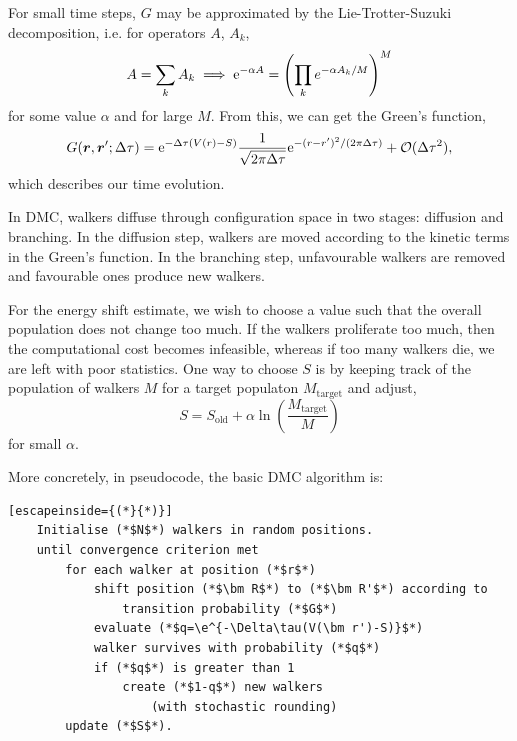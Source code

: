 For small time steps, $G$ may be approximated by the Lie-Trotter-Suzuki decomposition, i.e. for operators $A$, $A_k$,
\begin{equation}
    A = \sum_kA_k \implies \mathrm{e}^{-\alpha A} = \left( \prod_k e^{-\alpha A_k/M} \right)^M
\end{equation}
for some value $\alpha$ and for large $M$. From this, we can get the Green's function,
\begin{equation}
    G(\bm r, \bm r'; \Delta\tau) = \mathrm{e}^{-\Delta\tau(V(r)-S)}\frac{1}{\sqrt{2\pi\Delta\tau}}\mathrm{e}^{-(r - r')^2/(2\pi\Delta\tau)}+\mathcal{O}(\Delta\tau^2),
\end{equation}
which describes our time evolution.

In \gls{DMC}, walkers diffuse through configuration space in two stages: diffusion and branching. In the diffusion step, walkers are moved according to the kinetic terms in the Green's function. In the branching step, unfavourable walkers are removed and favourable ones produce new walkers.

For the energy shift estimate, we wish to choose a value such that the overall population does not change too much. If the walkers proliferate too much, then the computational cost becomes infeasible, whereas if too many walkers die, we are left with poor statistics. One way to choose $S$ is by keeping track of the population of walkers $M$ for a target populaton $M_\mathrm{target}$ and adjust,
\begin{equation}
    S = S_\mathrm{old} + \alpha\ln\left(\frac{M_\mathrm{target}}{M}\right)
\end{equation}
for small $\alpha$.

More concretely, in pseudocode, the basic \gls{DMC} algorithm is:

\begin{minipage}{\textwidth}
\begin{lstlisting}[escapeinside={(*}{*)}]
    Initialise (*$N$*) walkers in random positions.
    until convergence criterion met
        for each walker at position (*$r$*)
            shift position (*$\bm R$*) to (*$\bm R'$*) according to
                transition probability (*$G$*)
            evaluate (*$q=\e^{-\Delta\tau(V(\bm r')-S)}$*)
            walker survives with probability (*$q$*)
            if (*$q$*) is greater than 1
                create (*$1-q$*) new walkers
                    (with stochastic rounding)
        update (*$S$*).
\end{lstlisting}
\end{minipage}

